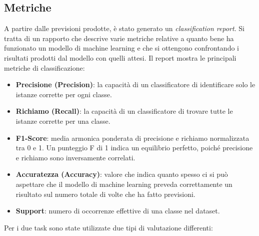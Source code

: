 \subsection{Metriche} \label{metriche}
A partire dalle previsioni prodotte, è stato generato un \textit{classification report}. Si tratta di un rapporto che descrive varie metriche relative a quanto bene ha funzionato un modello di machine learning e che si ottengono confrontando i risultati prodotti dal modello con quelli attesi. Il report mostra le principali metriche di classificazione:
\begin{itemize}
    \item \textbf{Precisione (Precision)}: la capacità di un classificatore di identificare solo le istanze corrette per ogni classe.
    \item \textbf{Richiamo (Recall)}: la capacità di un classificatore di trovare tutte le istanze corrette per una classe.
    \item \textbf{F1-Score}: media armonica ponderata di precisione e richiamo normalizzata tra 0 e 1. Un punteggio F di 1 indica un equilibrio perfetto, poiché precisione e richiamo sono inversamente correlati.
    \item \textbf{Accuratezza (Accuracy)}: valore che indica quanto spesso ci si può aspettare che il modello di machine learning preveda correttamente un risultato sul numero totale di volte che ha fatto previsioni.
    \item \textbf{Support}: numero di occorrenze effettive di una classe nel dataset.
\end{itemize}
Per i due task sono state utilizzate due tipi di valutazione differenti:
